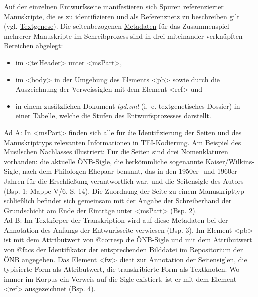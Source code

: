 \documentclass{article}
\begin{document}
    Auf der einzelnen Entwurfsseite manifestieren sich Spuren referenzierter
                  Manuskripte, die es zu identifizieren und als Referenznetz zu beschreiben gilt
                  (vgl. \href{http://gams.uni-graz.at/o:konde.28}{Textgenese}). Die
                  seitenbezogenen \href{http://gams.uni-graz.at/o:konde.25}{Metadaten} für das
                  Zusammenspiel mehrerer Manuskripte im Schreibprozess sind in drei miteinander
                  verknüpften Bereichen abgelegt: \\
            
        \begin{itemize}\item {im <teiHeader> unter <msPart>,}\item {im <body> in der Umgebung des Elements
                        <pb> sowie durch die Auszeichnung der
                     Verweissiglen mit dem Element <ref> und }\item {in einem zusätzlichen Dokument \emph{tgd.xml} (i. e.
                     textgenetisches Dossier) in einer Tabelle, welche die Stufen des
                     Entwurfsprozesses darstellt.}\end{itemize}Ad A: In <msPart> finden sich alle für die
                  Identifizierung der Seiten und des Manuskripttyps relevanten Informationen in \href{http://gams.uni-graz.at/o:konde.178}{TEI}-Kodierung. Am Beispiel des
                  Musilschen Nachlasses illustriert: Für die Seiten sind drei Nomenklaturen
                  vorhanden: die aktuelle ÖNB-Sigle, die herkömmliche sogenannte
                  Kaiser/Wilkins-Sigle, nach dem Philologen-Ehepaar benannt, das in den 1950er- und
                  1960er-Jahren für die Erschließung verantwortlich war, und die Seitensigle des
                  Autors (Bsp. 1: Mappe V/6, S. 14). Die Zuordnung der Seite zu einem Manuskripttyp
                  schließlich befindet sich gemeinsam mit der Angabe der Schreiberhand der
                  Grundschicht am Ende der Einträge unter <msPart> (Bsp. 2).\\
            
        Ad B: Im Textkörper der Transkription wird auf diese Metadaten bei der Annotation
                  des Anfangs der Entwurfsseite verwiesen (Bsp. 3). Im Element <pb> ist mit dem Attributwert von @corresp die ÖNB-Sigle und mit dem Attributwert von @facs der Identifikator der entsprechenden Bilddatei im Repositorium
                  der ÖNB angegeben. Das Element <fw> dient zur
                  Annotation der Seitensiglen, die typisierte Form als Attributwert, die
                  transkribierte Form als Textknoten. Wo immer im Korpus ein Verweis auf die Sigle
                  existiert, ist er mit dem Element <ref>
                  ausgezeichnet (Bsp. 4).\\
            
\end{document}
